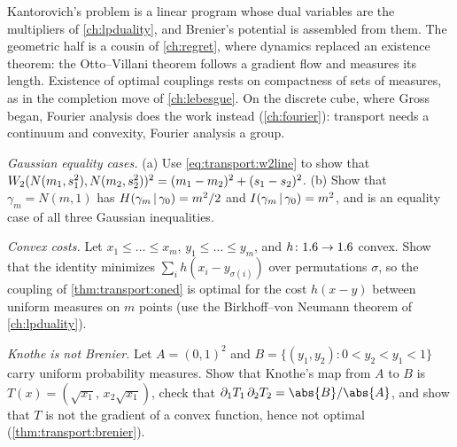 \begin{refsection}

Kantorovich's problem is a linear program whose dual variables are the multipliers of \cref{ch:lpduality}, and Brenier's potential is assembled from them. The geometric half is a cousin of \cref{ch:regret}, where dynamics replaced an existence theorem: the Otto--Villani theorem follows a gradient flow and measures its length. Existence of optimal couplings rests on compactness of sets of measures, as in the completion move of \cref{ch:lebesgue}. On the discrete cube, where Gross began, Fourier analysis does the work instead (\cref{ch:fourier}): transport needs a continuum and convexity, Fourier analysis a group.

\begin{exercises}
\item \consolidation\label{ex:transport:gauss} \emph{Gaussian equality cases.} (a) Use \eqref{eq:transport:w2line} to show that $W_2(N(m_1,s_1^2),N(m_2,s_2^2))^2=(m_1-m_2)^2+(s_1-s_2)^2$. (b) Show that $\gamma_m=N(m,1)$ has $H(\gamma_m\,|\,\gamma_0)=m^2/2$ and $I(\gamma_m\,|\,\gamma_0)=m^2$, and is an equality case of all three Gaussian inequalities.

\item \consolidation\label{ex:transport:convexcost} \emph{Convex costs.} Let $x_1\le\dots\le x_m$, $y_1\le\dots\le y_m$, and $h\colon1.6\to1.6$ convex. Show that the identity minimizes $\sum_ih(x_i-y_{\sigma(i)})$ over permutations $\sigma$, so the coupling of \cref{thm:transport:oned} is optimal for the cost $h(x-y)$ between uniform measures on $m$ points (use the Birkhoff--von Neumann theorem of \cref{ch:lpduality}). 

\item \consolidation\label{ex:transport:knothe} \emph{Knothe is not Brenier.} Let $A=(0,1)^2$ and $B=\{(y_1,y_2):0<y_2<y_1<1\}$ carry uniform probability measures. Show that Knothe's map from $A$ to $B$ is $T(x)=(\sqrt{x_1},\,x_2\sqrt{x_1})$, check that $\partial_1T_1\,\partial_2T_2=\abs{B}/\abs{A}$, and show that $T$ is not the gradient of a convex function, hence not optimal (\cref{thm:transport:brenier}). 


\end{exercises}
\end{refsection}
